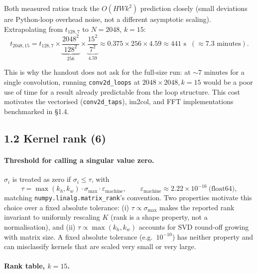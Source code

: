 \documentclass[11pt]{article}
\begin{document}
Both measured ratios track the $O(HWk^2)$ prediction closely (small deviations are Python-loop
overhead noise, not a different asymptotic scaling). Extrapolating from $t_{128,7}$ to
$N=2048$, $k=15$:
\[
t_{2048,15} = t_{128,7} \times \underbrace{\frac{2048^2}{128^2}}_{256} \times
\underbrace{\frac{15^2}{7^2}}_{4.59} \approx 0.375 \times 256 \times 4.59 \approx 441\text{ s}
\;\;(\approx 7.3\text{ minutes}).
\]

This is why the handout does not ask for the full-size run: at $\sim 7$ minutes for a single
convolution, running \texttt{conv2d\_loops} at $2048\times2048, k{=}15$ would be a poor use of
time for a result already predictable from the loop structure. This cost motivates the vectorised
(\texttt{conv2d\_taps}), im2col, and FFT implementations benchmarked in \S1.4.

\subsection*{1.2 Kernel rank (6)}

\paragraph{Threshold for calling a singular value zero.}
$\sigma_i$ is treated as zero if $\sigma_i \le \tau$, with
\[
\tau = \max(k_h, k_w) \cdot \sigma_{\max} \cdot \varepsilon_{\text{machine}},
\qquad \varepsilon_{\text{machine}} \approx 2.22\times10^{-16}\ \text{(float64)},
\]
matching \texttt{numpy.linalg.matrix\_rank}'s convention. Two properties motivate this choice
over a fixed absolute tolerance: (i) $\tau \propto \sigma_{\max}$ makes the reported rank
invariant to uniformly rescaling $K$ (rank is a shape property, not a normalisation), and (ii)
$\tau \propto \max(k_h,k_w)$ accounts for SVD round-off growing with matrix size. A fixed
absolute tolerance (e.g.\ $10^{-10}$) has neither property and can misclassify kernels that are
scaled very small or very large.

\paragraph{Rank table, $k=15$.}
\begin{table}[H]
\centering

\caption{Numerical rank of every supplied kernel at $k=15$, with $\sigma_{\max}$ and the
threshold $\tau$ used to call a singular value zero.}
\label{tab:rank_table}
\end{table}
\end{document}
